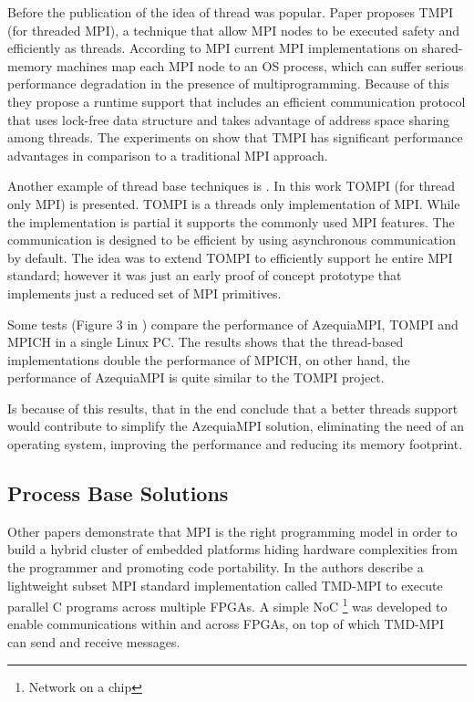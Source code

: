 Before the publication of \cite{Gallego} the idea of thread was popular.
Paper \cite{Tang} proposes TMPI (for threaded MPI), a technique that  allow MPI
nodes to be executed safety and efficiently as threads. According to
\cite{Tang} MPI current MPI implementations on shared-memory machines map each
MPI node to an OS process, which can suffer serious performance degradation in
the presence of multiprogramming. Because of this they propose a runtime
support that includes an efficient communication protocol that uses lock-free
data structure and takes advantage of address space sharing among threads. The
experiments on \cite{Tang} show that TMPI has significant performance
advantages in comparison to a traditional MPI approach.

Another example of thread base techniques is \cite{Demaine} . In this work
TOMPI (for thread only MPI) is presented. TOMPI is a threads only
implementation of MPI. While the implementation is partial it supports the
commonly used MPI features. The communication is designed to be efficient by
using asynchronous communication by default. The idea was to extend TOMPI to
efficiently support he entire MPI standard; however it was just an early proof
of concept prototype that implements just a reduced set of MPI primitives. 

Some tests (Figure 3 in \cite{Gallego}) compare the performance of AzequiaMPI,
TOMPI and MPICH in a single Linux PC. The results shows that the thread-based
implementations double the performance of MPICH, on other hand, the performance
of AzequiaMPI is quite similar to the TOMPI project. 

Is because of this results, that in the end \cite{Gallego} conclude that a better
threads support would contribute to simplify the AzequiaMPI solution,
eliminating the need of an operating system, improving the performance and
reducing its memory footprint. 

\subsection{Process Base Solutions}

Other papers \cite{Saldana-Chow} \cite{Williams} demonstrate that MPI is the
right programming model in order to build a hybrid cluster of embedded
platforms hiding hardware complexities from the programmer and promoting code
portability. In \cite{Saldana-Chow} the authors describe a lightweight subset
MPI standard implementation called TMD-MPI to execute parallel C programs
across multiple FPGAs. A simple NoC \footnote{Network on a chip} was developed
to enable communications within and across FPGAs, on top of which TMD-MPI can
send and receive messages. 

